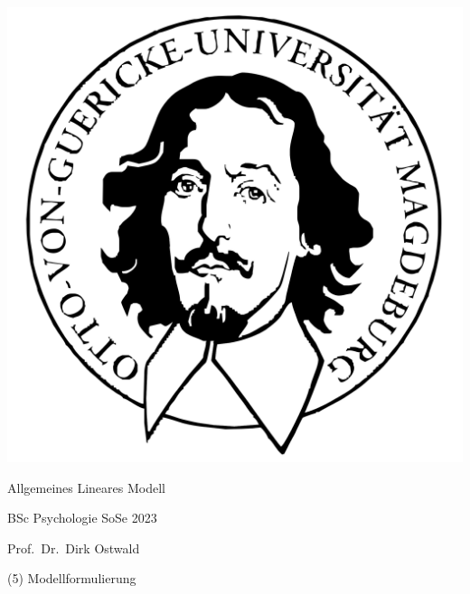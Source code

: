 \documentclass[
  8pt,
  ignorenonframetext,
]{beamer}
\author{}
\date{\vspace{-2.5em}}
\begin{document}
\begin{frame}[plain]{}
\protect\hypertarget{section}{}
\center

\begin{center}\includegraphics[width=0.2\linewidth]{5_Abbildungen/alm_5_otto} \end{center}

\vspace{2mm}

\huge

Allgemeines Lineares Modell \vspace{6mm}

\large

BSc Psychologie SoSe 2023

\vspace{6mm}
\normalsize

Prof.~Dr.~Dirk Ostwald
\end{frame}

\begin{frame}[plain]{}
\protect\hypertarget{section-1}{}
\center
\huge
\vfill

\noindent (5) Modellformulierung \vfill
\end{frame}
\end{document}
